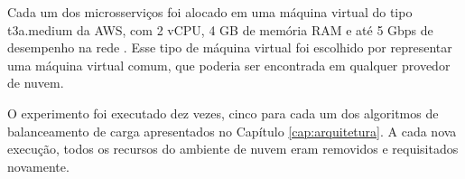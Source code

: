 Cada um dos microsserviços foi alocado em uma máquina virtual do tipo t3a.medium da AWS, com 2 vCPU, 4 GB de memória RAM e até 5 Gbps de desempenho na rede \citep{AWSTypes}. Esse tipo de máquina virtual foi escolhido por representar uma máquina virtual comum, que poderia ser encontrada em qualquer provedor de nuvem.



O experimento foi executado dez vezes, cinco para cada um dos algoritmos de balanceamento de carga apresentados no Capítulo \ref{cap:arquitetura}. A cada nova execução, todos os recursos do ambiente de nuvem eram removidos e requisitados novamente.






